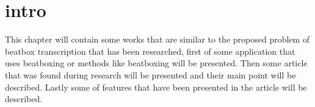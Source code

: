 \section{intro}
This chapter will contain some works that are similar to the proposed problem of beatbox transcription that has been researched, first of some application that uses beatboxing or methods like beatboxing will be presented. Then some article that was found during research will be presented and their main point will be described. Lastly some of features that have been presented in the article will be described.